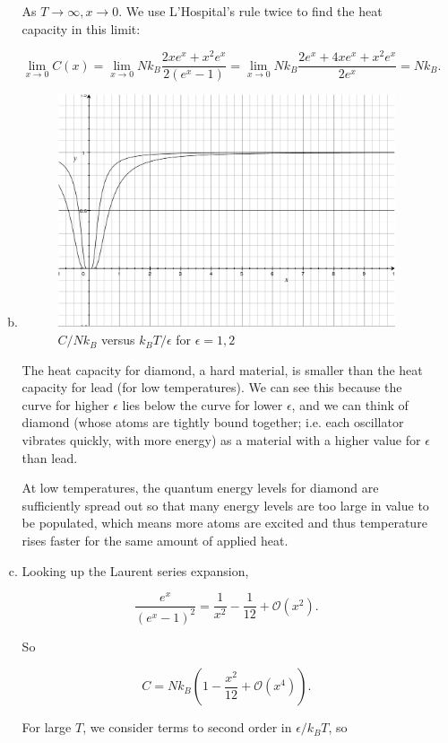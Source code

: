 \documentclass{article}
\begin{document}
\begin{enumerate}
\begin{enumerate}[(a)]
		As $T \to \infty, x \to 0$. We use L'Hospital's rule twice to find the heat capacity in this limit: 

		$$\lim_{x \to 0} C(x) = \lim_{x \to 0} N k_B \frac{2x e^x + x^2 e^x}{2(e^x - 1)} = \lim_{x \to 0} N k_B \frac{2 e^x + 4x e^x + x^2 e^x}{2e^x} = N k_B.$$

		\item

		\begin{figure}[H]
		\caption{$C/Nk_B$ versus $k_B T / \epsilon$ for $\epsilon = 1, 2$}
		\centering
		\includegraphics[width=10cm]{img/5-heatcapacity}
		\end{figure}

		The heat capacity for diamond, a hard material, is smaller than the heat capacity for lead (for low temperatures). We can see this because the curve for higher $\epsilon$ lies below the curve for lower $\epsilon$, and we can think of diamond (whose atoms are tightly bound together; i.e. each oscillator vibrates quickly, with more energy) as a material with a higher value for $\epsilon$ than lead.

		At low temperatures, the quantum energy levels for diamond are sufficiently spread out so that many energy levels are too large in value to be populated, which means more atoms are excited and thus temperature rises faster for the same amount of applied heat.

		\item

		Looking up the Laurent series expansion,

		$$\frac{e^x}{(e^x -1)^2} = \frac{1}{x^2} - \frac{1}{12} + \mathcal{O}(x^2).$$

		So

		$$C = Nk_B \left(1 - \frac{x^2}{12} + \mathcal{O}(x^4) \right).$$

		For large $T$, we consider terms to second order in $\epsilon/k_B T$, so


\end{enumerate}
\end{enumerate}
\end{document}
